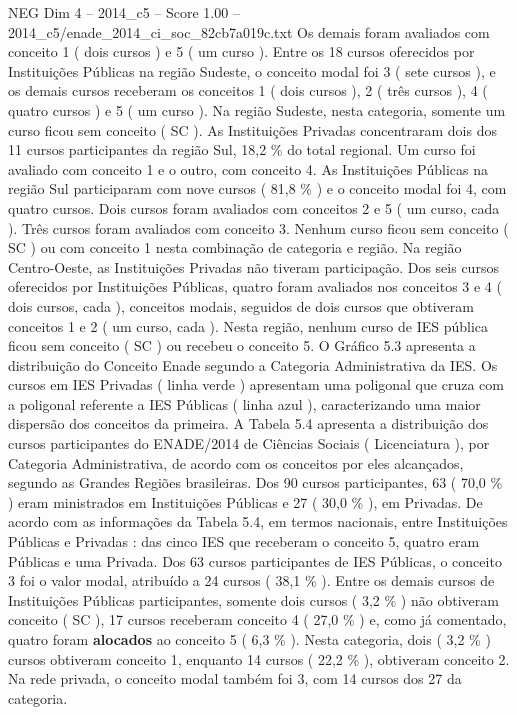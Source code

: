 \begin{textsample}{NEG Dim 4 – 2014\_c5 – Score 1.00 – 2014\_c5/enade\_2014\_ci\_soc\_82cb7a019c.txt}
Os demais foram avaliados com conceito 1 ( dois cursos ) e 5 ( um curso ).
Entre os 18 cursos oferecidos por Instituições Públicas na região Sudeste, o conceito modal foi 3 ( sete cursos ), e os demais cursos receberam os conceitos 1 ( dois cursos ), 2 ( três cursos ), 4 ( quatro cursos ) e 5 ( um curso ).
Na região Sudeste, nesta categoria, somente um curso ficou sem conceito ( SC ).
As Instituições Privadas concentraram dois dos 11 cursos participantes da região Sul, 18,2 \% do total regional.
Um curso foi avaliado com conceito 1 e o outro, com conceito 4.
As Instituições Públicas na região Sul participaram com nove cursos ( 81,8 \% ) e o conceito modal foi 4, com quatro cursos.
Dois cursos foram avaliados com conceitos 2 e 5 ( um curso, cada ).
Três cursos foram avaliados com conceito 3.
Nenhum curso ficou sem conceito ( SC ) ou com conceito 1 nesta combinação de categoria e região.
Na região Centro-Oeste, as Instituições Privadas não tiveram participação.
Dos seis cursos oferecidos por Instituições Públicas, quatro foram avaliados nos conceitos 3 e 4 ( dois cursos, cada ), conceitos modais, seguidos de dois cursos que obtiveram conceitos 1 e 2 ( um curso, cada ).
Nesta região, nenhum curso de IES pública ficou sem conceito ( SC ) ou recebeu o conceito 5.
O Gráfico 5.3 apresenta a distribuição do Conceito Enade segundo a Categoria Administrativa da IES.
Os cursos em IES Privadas ( linha verde ) apresentam uma poligonal que cruza com a poligonal referente a IES Públicas ( linha azul ), caracterizando uma maior dispersão dos conceitos da primeira.
A Tabela 5.4 apresenta a distribuição dos cursos participantes do ENADE/2014 de Ciências Sociais ( Licenciatura ), por Categoria Administrativa, de acordo com os conceitos por eles alcançados, segundo as Grandes Regiões brasileiras.
Dos 90 cursos participantes, 63 ( 70,0 \% ) eram ministrados em Instituições Públicas e 27 ( 30,0 \% ), em Privadas.
De acordo com as informações da Tabela 5.4, em termos nacionais, entre Instituições Públicas e Privadas : das cinco IES que receberam o conceito 5, quatro eram Públicas e uma Privada.
Dos 63 cursos participantes de IES Públicas, o conceito 3 foi o valor modal, atribuído a 24 cursos ( 38,1 \% ).
Entre os demais cursos de Instituições Públicas participantes, somente dois cursos ( 3,2 \% ) não obtiveram conceito ( SC ), 17 cursos receberam conceito 4 ( 27,0 \% ) e, como já comentado, quatro foram \textbf{alocados} ao conceito 5 ( 6,3 \% ).
Nesta categoria, dois ( 3,2 \% ) cursos obtiveram conceito 1, enquanto 14 cursos ( 22,2 \% ), obtiveram conceito 2.
Na rede privada, o conceito modal também foi 3, com 14 cursos dos 27 da categoria.

\end{textsample}
